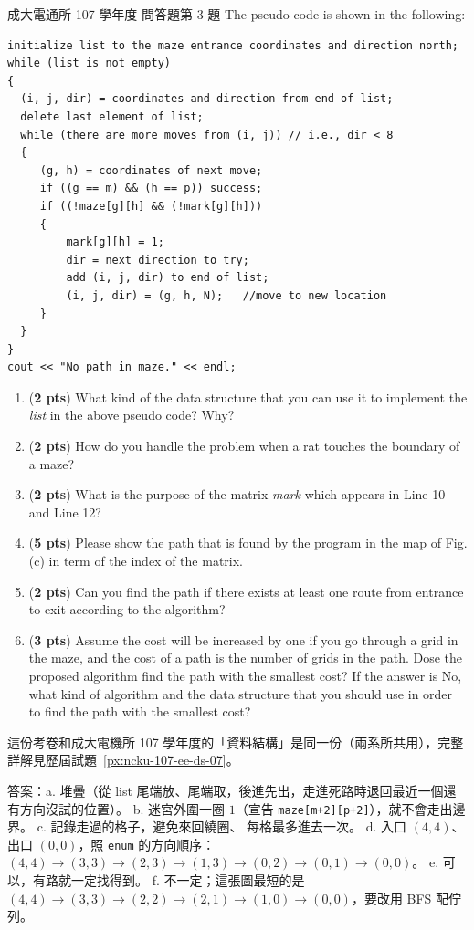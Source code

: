 \begin{pastexam}[label={px:ncku-107-cce-07}]{成大電通所 107 學年度 問答題第 3 題}
The pseudo code is shown in the following:
\begin{verbatim}
initialize list to the maze entrance coordinates and direction north;
while (list is not empty)
{
  (i, j, dir) = coordinates and direction from end of list;
  delete last element of list;
  while (there are more moves from (i, j)) // i.e., dir < 8
  {
     (g, h) = coordinates of next move;
     if ((g == m) && (h == p)) success;
     if ((!maze[g][h] && (!mark[g][h]))
     {
         mark[g][h] = 1;
         dir = next direction to try;
         add (i, j, dir) to end of list;
         (i, j, dir) = (g, h, N);   //move to new location
     }
  }
}
cout << "No path in maze." << endl;
\end{verbatim}
\begin{enumerate}[label=\alph*.]
\item (\textbf{2 pts}) What kind of the data structure that you can use it to implement the \textit{list} in the above pseudo code? Why?
\item (\textbf{2 pts}) How do you handle the problem when a rat touches the boundary of a maze?
\item (\textbf{2 pts}) What is the purpose of the matrix \textit{mark} which appears in Line 10 and Line 12?
\item (\textbf{5 pts}) Please show the path that is found by the program in the map of Fig. (c) in term of the index of the matrix.
\item (\textbf{2 pts}) Can you find the path if there exists at least one route from entrance to exit according to the algorithm?
\item (\textbf{3 pts}) Assume the cost will be increased by one if you go through a grid in the maze, and the cost of a path is the number of grids in the path. Dose the proposed algorithm find the path with the smallest cost? If the answer is No, what kind of algorithm and the data structure that you should use in order to find the path with the smallest cost?
\end{enumerate}
\end{pastexam}

\begin{pastsoln}
這份考卷和成大電機所 107 學年度的「資料結構」是同一份（兩系所共用），完整詳解見歷屆試題~\ref{px:ncku-107-ee-ds-07}。

答案：a. 堆疊（從 list 尾端放、尾端取，後進先出，走進死路時退回最近一個還有方向沒試的位置）。
b. 迷宮外圍一圈 $1$（宣告 \texttt{maze[m+2][p+2]}），就不會走出邊界。 c. 記錄走過的格子，避免來回繞圈、
每格最多進去一次。 d. 入口 $(4,4)$、出口 $(0,0)$，照 \texttt{enum} 的方向順序：
$(4,4) \to (3,3) \to (2,3) \to (1,3) \to (0,2) \to (0,1) \to (0,0)$。 e. 可以，有路就一定找得到。
f. 不一定；這張圖最短的是 $(4,4) \to (3,3) \to (2,2) \to (2,1) \to (1,0) \to (0,0)$，要改用 BFS 配佇列。
\end{pastsoln}
